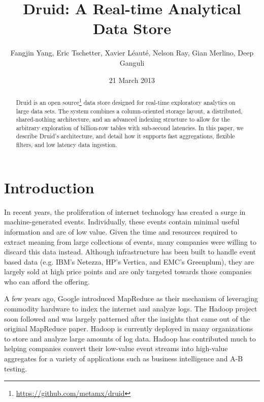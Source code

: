 \documentclass{acm_proc_article-sp}
\begin{document}

\title{Druid: A Real-time Analytical Data Store}


\author{
\alignauthor Fangjin Yang, Eric Tschetter, Xavier Léauté, Nelson Ray, Gian Merlino, Deep Ganguli\\
}
\date{21 March 2013}

\maketitle

\begin{abstract} 
Druid is an open
source\footnote{\href{https://github.com/metamx/druid}{https://github.com/metamx/druid}}
data store designed for real-time exploratory analytics on large data sets.
The system combines a column-oriented storage layout, a distributed,
shared-nothing architecture, and an advanced indexing structure to allow for
the arbitrary exploration of billion-row tables with sub-second latencies. In
this paper, we describe Druid's architecture, and detail how it supports fast
aggregations, flexible filters, and low latency data ingestion.  
\end{abstract}

\section{Introduction} 
In recent years, the proliferation of internet technology has
created a surge in machine-generated events.  Individually, these
events contain minimal useful information and are of low value.  Given the
time and resources required to extract meaning from large collections of
events, many companies were willing to discard this data instead.  Although
infrastructure has been built to handle event based data (e.g. IBM's
Netezza\cite{singh2011introduction}, HP's Vertica\cite{bear2012vertica}, and EMC's
Greenplum\cite{miner2012unified}), they are largely sold at high price points
and are only targeted towards those companies who can afford the offering.

A few years ago, Google introduced MapReduce \cite{dean2008mapreduce} as their
mechanism of leveraging commodity hardware to index the internet and analyze
logs.  The Hadoop \cite{shvachko2010hadoop} project soon followed and was
largely patterned after the insights that came out of the original MapReduce
paper. Hadoop is currently deployed in many organizations to store and analyze
large amounts of log data.  Hadoop has contributed much to helping companies
convert their low-value event streams into high-value aggregates for a variety
of applications such as business intelligence and A-B testing.
\end{document}
